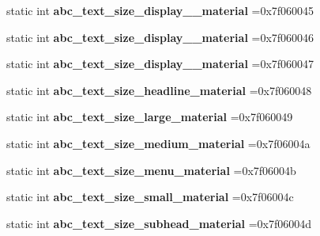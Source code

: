 \begin{DoxyCompactItemize}
static int {\bfseries abc\+\_\+text\+\_\+size\+\_\+display\+\_\+\_\+material} =0x7f060045
\item 
\mbox{\label{classandroid_1_1support_1_1v4_1_1R_1_1dimen_abfb13bbed7709fa91de3b2706ad3c88c}} 
static int {\bfseries abc\+\_\+text\+\_\+size\+\_\+display\+\_\+\_\+material} =0x7f060046
\item 
\mbox{\label{classandroid_1_1support_1_1v4_1_1R_1_1dimen_a59ce78e134032ed97e8bf15145ca2b70}} 
static int {\bfseries abc\+\_\+text\+\_\+size\+\_\+display\+\_\+\_\+material} =0x7f060047
\item 
\mbox{\label{classandroid_1_1support_1_1v4_1_1R_1_1dimen_ab3aaa857ddb0882fd946ed6221f290b8}} 
static int {\bfseries abc\+\_\+text\+\_\+size\+\_\+headline\+\_\+material} =0x7f060048
\item 
\mbox{\label{classandroid_1_1support_1_1v4_1_1R_1_1dimen_a50f19fbfde9d29ff0c6d4939addeb9f8}} 
static int {\bfseries abc\+\_\+text\+\_\+size\+\_\+large\+\_\+material} =0x7f060049
\item 
\mbox{\label{classandroid_1_1support_1_1v4_1_1R_1_1dimen_a505cc3f43d2c9792465b79129d3cb74f}} 
static int {\bfseries abc\+\_\+text\+\_\+size\+\_\+medium\+\_\+material} =0x7f06004a
\item 
\mbox{\label{classandroid_1_1support_1_1v4_1_1R_1_1dimen_a78530960514cbbfeb8a8c17c840c252e}} 
static int {\bfseries abc\+\_\+text\+\_\+size\+\_\+menu\+\_\+material} =0x7f06004b
\item 
\mbox{\label{classandroid_1_1support_1_1v4_1_1R_1_1dimen_a2d242f16c205e8d04c23fb65a172ec20}} 
static int {\bfseries abc\+\_\+text\+\_\+size\+\_\+small\+\_\+material} =0x7f06004c
\item 
\mbox{\label{classandroid_1_1support_1_1v4_1_1R_1_1dimen_a063fa3df38d3061eb0ddd52893a0f217}} 
static int {\bfseries abc\+\_\+text\+\_\+size\+\_\+subhead\+\_\+material} =0x7f06004d

\end{DoxyCompactItemize}

